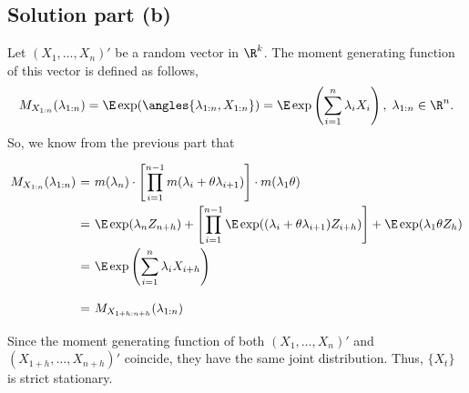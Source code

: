 \subsection*{Solution part (b)}

Let $(X_{1},\ldots, X_{n})'$ be a random vector in $\R^{k}$. The moment generating function of this vector is defined as follows, 
\[ M_{X_{1:n}}(\lambda_{1:n}) = \E \exp(\angles{\lambda_{1:n},X_{1:n}}) = \E \exp\left( \sum_{i = 1}^{n} \lambda_i X_i \right),\; \lambda_{1:n} \in \R^n. \]
So, we know from the previous part that
\[ \everymath{\displaystyle}
\arraycolsep=1.8pt\def\arraystretch{2.5}
\begin{array}{rcl}
    M_{X_{1:n}}(\lambda_{1:n})& = & m(\lambda_n) \cdot \left[ \prod_{i = 1}^{n-1} m(\lambda_i + \theta \lambda_{i+1}) \right] \cdot m(\lambda_1 \theta)\\
    & = & \E\exp(\lambda_n Z_{n+h}) + \left[ \prod_{i = 1}^{n-1} \E \exp((\lambda_i + \theta \lambda_{i+1}) Z_{i+h}) \right] + \E\exp(\lambda_1 \theta Z_{h})\\
    & = & \E \exp\left( \sum_{i = 1}^{n} \lambda_i X_{i+h} \right)\\
    & = & M_{X_{1+h:n+h}}(\lambda_{1:n})
\end{array} \]
Since the moment generating function of both $(X_{1},\ldots, X_{n})'$ and $(X_{1+h},\ldots, X_{n+h})'$ coincide, they have the same joint distribution. Thus, $\{X_t\}$ is strict stationary.